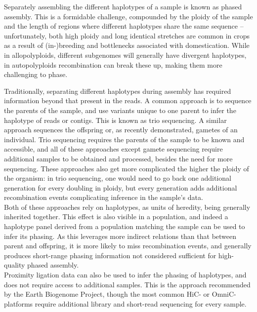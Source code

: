Separately assembling the different haplotypes of a sample is known as phased assembly.
This is a formidable challenge, compounded by the ploidy of the sample and the length of regions where different haplotypes share the same sequence -- unfortunately, both high ploidy and long identical stretches are common in crops as a result of (in-)breeding and bottlenecks associated with domestication.
While in allopolyploids, different subgenomes will generally have divergent haplotypes, in autopolyploids recombination can break these up, making them more challenging to phase. %

Traditionally, separating different haplotypes during assembly has required information beyond that present in the reads.
A common approach is to sequence the parents of the sample, and use variants unique to one parent to infer the haplotype of reads or contigs.
This is known as trio sequencing.
A similar approach sequences the offspring or, as recently demonstrated, gametes of an individual\cite{campoy20}.
Trio sequencing requires the parents of the sample to be known and accessible, and all of these approaches except gamete sequencing require additional samples to be obtained and processed, besides the need for more sequencing.
These approaches also get more complicated the higher the ploidy of the organism: in trio sequencing, one would need to go back one additional generation for every doubling in ploidy, but every generation adds additional recombination events complicating inference in the sample's data.\\ %
Both of these approaches rely on haplotypes, as units of heredity, being generally inherited together.
This effect is also visible in a population, and indeed a haplotype panel derived from a population matching the sample can be used to infer its phasing.
As this leverages more indirect relations than that between parent and offspring, it is more likely to miss recombination events, and generally produces short-range phasing information not considered sufficient for high-quality phased assembly.
\\
Proximity ligation data can also be used to infer the phasing of haplotypes, and does not require access to additional samples.
This is the approach recommended by the Earth Biogenome Project, though the most common HiC- or OmniC-platforms require additional library and short-read sequencing for every sample\cite{ebpseqrecs}.
